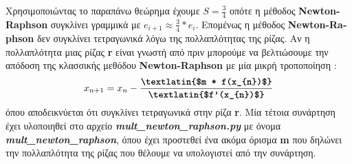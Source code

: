 \documentclass[First Project.tex]{subfiles}
\begin{document}
\begin{itemize}
            Χρησιμοποιώντας το παραπάνω θεώρημα έχουμε \(S = \frac {3}{4}\) οπότε η μέθοδος \textlatin{\textbf{Newton-Raphson}} συγκλίνει γραμμικά
            με \(e_{i+1} \approx \frac{3}{4} * e_{i}\). Επομένως η μέθοδος \textlatin{\textbf{Newton-Raphson}} δεν συγκλίνει τετραγωνικά λόγω της πολλαπλότητας της ρίζας.
            Αν η πολλαπλότητα μιας ρίζας \textlatin{\textbf{r}} είναι γνωστή από πριν μπορούμε να βελτιώσουμε την απόδοση της κλασσικής μεθόδου \textlatin{\textbf{Newton-Raphson}}
            με μία μικρή τροποποίηση :
            \begin{equation*}
                x_{n+1} = x_{n} - \frac{\textbf{\textlatin{$m * f(x_{n})$}}} { \textbf{\textlatin{$f'(x_{n})$}} }
            \end{equation*}
            όπου αποδεικνύεται ότι συγκλίνει τετραγωνικά στην ρίζα \textlatin{\textbf{r}}. Μία τέτοια συνάρτηση έχει υλοποιηθεί στο αρχείο \textit{\textlatin{\textbf{mult\_newton\_raphson.py}}}
            με όνομα \textit{\textlatin{\textbf{mult\_newton\_raphson}}}, όπου έχει προστεθεί ένα ακόμα όρισμα \textlatin{\textbf{m}} που δηλώνει
            την πολλαπλότητα της ρίζας που θέλουμε να υπολογιστεί από την συνάρτηση.
    \end{itemize}
\end{document}
